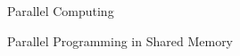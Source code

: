 \begin{section}{Parallel Computing}
\begin{subsection}{Parallel Programming in Shared Memory}
%
%
%
%
%
%
%


\end{subsection}
\end{section}
